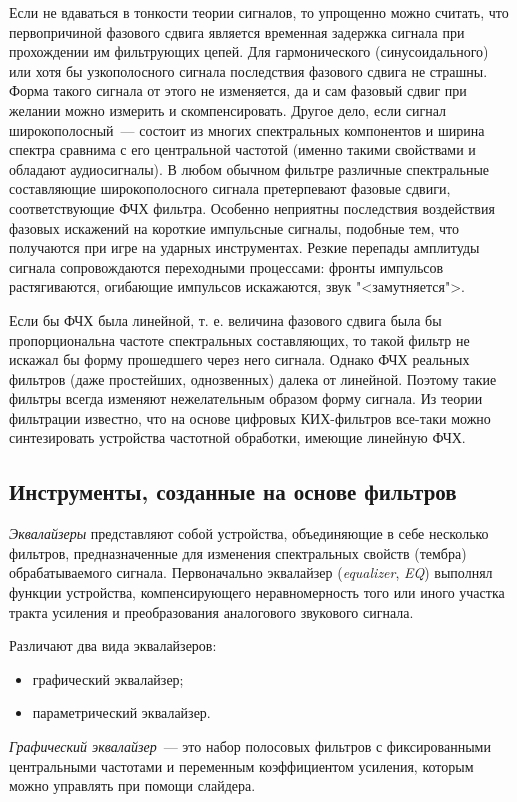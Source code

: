 \documentclass[oneside, final, 14pt]{extreport}
\begin{document}
Если не вдаваться в тонкости теории сигналов, то упрощенно можно считать, что первопричиной фазового сдвига является временная задержка сигнала при прохождении им фильтрующих цепей. Для гармонического (синусоидального) или хотя бы узкополосного сигнала последствия фазового сдвига не страшны. Форма такого сигнала от этого не изменяется, да и сам фазовый сдвиг при желании можно измерить и скомпенсировать. Другое дело, если сигнал широкополосный~--- состоит из многих спектральных компонентов и ширина спектра сравнима с его центральной частотой (именно такими свойствами и обладают аудиосигналы). В любом обычном фильтре различные спектральные составляющие широкополосного сигнала претерпевают фазовые сдвиги, соответствующие ФЧХ фильтра. Особенно неприятны последствия воздействия фазовых искажений на короткие импульсные сигналы, подобные тем, что получаются при игре на ударных инструментах. Резкие перепады амплитуды сигнала сопровождаются переходными процессами: фронты импульсов растягиваются, огибающие импульсов искажаются, звук "<замутняется">.

Если бы ФЧХ была линейной, т. е. величина фазового сдвига была бы пропорциональна частоте спектральных составляющих, то такой фильтр не искажал бы форму прошедшего через него сигнала. Однако ФЧХ реальных фильтров (даже простейших, однозвенных) далека от линейной. Поэтому такие фильтры всегда изменяют нежелательным образом форму сигнала.
Из теории фильтрации известно, что на основе цифровых КИХ-фильтров все-таки можно синтезировать устройства частотной обработки, имеющие линейную ФЧХ.

\subsection{Инструменты, созданные на основе фильтров}
\emph{Эквалайзеры} представляют собой устройства, объединяющие в себе несколько фильтров, предназначенные для изменения спектральных свойств (тембра) обрабатываемого сигнала. Первоначально эквалайзер (\emph{equalizer}, \emph{EQ}) выполнял функции устройства, компенсирующего неравномерность того или иного участка тракта усиления и преобразования аналогового звукового сигнала.

Различают два вида эквалайзеров:
\begin{itemize}
  \item графический эквалайзер;
  \item параметрический эквалайзер.
\end{itemize}

\emph{Графический эквалайзер}~--- это набор полосовых фильтров с фиксированными центральными частотами и переменным коэффициентом усиления, которым можно управлять при помощи слайдера.
\end{document}
